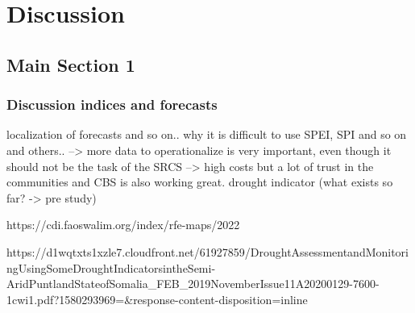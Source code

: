 
\chapter{Discussion} %

\label{Chapter5} %


\section{Main Section 1}

\subsection{Discussion indices and forecasts}

localization of forecasts and so on.. why it is difficult to use SPEI, SPI and so on and others.. --> more data to operationalize is very important, even though it should not be the task of the SRCS --> high costs but a lot of trust in the communities and CBS is also working great.
drought indicator (what exists so far? -> pre study)

https://cdi.faoswalim.org/index/rfe-maps/2022

https://d1wqtxts1xzle7.cloudfront.net/61927859/DroughtAssessmentandMonitoringUsingSomeDroughtIndicatorsintheSemi-AridPuntlandStateofSomalia_FEB_2019NovemberIssue11A20200129-7600-1cwi1.pdf?1580293969=&response-content-disposition=inline%

